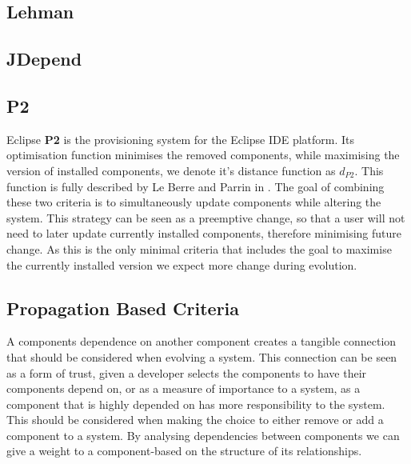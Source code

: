 \subsection{Lehman}

\subsection{JDepend}


\subsection{P2}
Eclipse \textbf{P2} \cite{le_berre_dependency_2009,leBerre2010} is the provisioning system for the Eclipse IDE platform.
Its optimisation function minimises the removed components, while maximising the version of installed components, 
we denote it's distance function as $d_{P2}$.
This function is fully described by Le Berre and Parrin in \cite{leBerre2010}.
The goal of combining these two criteria is to simultaneously update components while altering the system.
This strategy can be seen as a preemptive change, so that a user will not need to later update currently installed components,
therefore minimising future change.
As this is the only minimal criteria that includes the goal to maximise the currently installed version 
we expect more change during evolution.

\subsection{Propagation Based Criteria}
{}A components dependence on another component creates a tangible connection that should be considered when evolving a system.
{}This connection can be seen as a form of trust, given a developer selects the components to have their components depend on,
{}or as a measure of importance to a system, as a component that is highly depended on has more responsibility to the system.
{}This should be considered when making the choice to either remove or add a component to a system.
{}By analysing dependencies between components we can give a weight to a component-based on the structure of its relationships.

